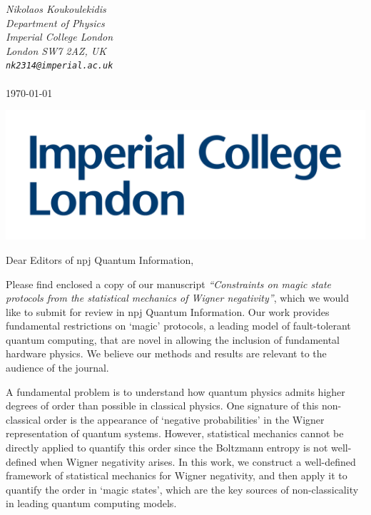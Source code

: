 \documentclass[11pt]{letter}
\begin{document}
\hfill\begin{minipage}{6cm}
	\raggedright
	\vspace{-2.5cm}
	{\footnotesize\itshape Nikolaos Koukoulekidis}\\
	{\footnotesize\itshape Department of Physics}\\
	{\footnotesize\itshape Imperial College London}\\
	{\footnotesize\itshape London SW7 2AZ, UK}\\
	{\footnotesize\itshape %
		\verb|nk2314@imperial.ac.uk|}\\
	~\\
		\footnotesize\today
\end{minipage}

\vspace{-3.5cm}
\includegraphics[scale=.1]{icllogo.png}
\vspace{3.5cm}

\vspace{-1.5cm}
Dear Editors of npj Quantum Information,

\vspace{.3cm}
	
Please find enclosed a copy of our manuscript \emph{``Constraints on magic state protocols from the statistical mechanics of Wigner negativity''}, which we would like to submit for review in npj Quantum Information. 
Our work provides fundamental restrictions on `magic' protocols, a leading model of fault-tolerant quantum computing, that are novel in allowing the inclusion of fundamental hardware physics. We believe our methods and results are relevant to the audience of the journal.

A fundamental problem is to understand how quantum physics admits higher degrees of order than possible in classical physics. One signature of this non-classical order is the appearance of `negative probabilities' in the Wigner representation of quantum systems. However, statistical mechanics cannot be directly applied to quantify this order since the Boltzmann entropy is not well-defined when Wigner negativity arises. In this work, we construct a well-defined framework of statistical mechanics for Wigner negativity, and then apply it to quantify the order in `magic states', which are the key sources of non-classicality in leading quantum computing models.
\end{document}
